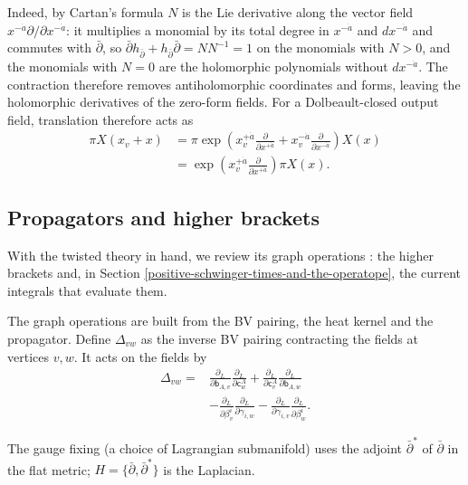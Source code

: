 \documentclass[11pt]{article}
\numberwithin{equation}{section}
\numberwithin{figure}{section}
\numberwithin{table}{section}
\begin{document}
Indeed, by Cartan's formula $N$ is the Lie derivative along the vector field $x^{-\dot a}\partial/\partial x^{-\dot a}$: it multiplies a monomial by its total degree in $x^{-\dot a}$ and $dx^{-\dot a}$ and commutes with $\bar\partial$, so $\bar\partial h_{\bar\partial}+h_{\bar\partial}\bar\partial=NN^{-1}=1$ on the monomials with $N>0$, and the monomials with $N=0$ are the holomorphic polynomials without $dx^{-\dot a}$. The contraction therefore removes antiholomorphic coordinates and forms, leaving the holomorphic derivatives of the zero-form fields. For a Dolbeault-closed output field, translation therefore acts as
\begin{equation}\label{eq-B-21}
\begin{aligned}
\pi X(x_v+x)
&=\pi\exp\left(x_v^{+\dot a}\frac{\partial}{\partial x^{+\dot a}}
+x_v^{-\dot a}\frac{\partial}{\partial x^{-\dot a}}\right)X(x)\\
&=\exp\left(x_v^{+\dot a}\frac{\partial}{\partial x^{+\dot a}}\right)\pi X(x).
\end{aligned}
\end{equation}

\subsection{Propagators and higher brackets}\label{sec-brackets}\label{sec-setup}

With the twisted theory in hand, we review its graph operations \cite{semichiral,Wang,operatope,higher,BK}: the higher brackets and, in Section \ref{positive-schwinger-times-and-the-operatope}, the current integrals that evaluate them.

The graph operations are built from the BV pairing, the heat kernel and the propagator. Define $\Delta_{vw}$ as the inverse BV pairing contracting the fields at vertices $v,w$. It acts on the fields by
\begin{equation}\label{eq-A-20}
\begin{aligned}
\Delta_{vw}={}&
\frac{\partial_L}{\partial\mathsf b_{A,v}}
\frac{\partial_L}{\partial\mathsf c_w^A}
+
\frac{\partial_L}{\partial\mathsf c_v^A}
\frac{\partial_L}{\partial\mathsf b_{A,w}}
\\
&-
\frac{\partial_L}{\partial\beta_v^i}
\frac{\partial_L}{\partial\gamma_{i,w}}
-
\frac{\partial_L}{\partial\gamma_{i,v}}
\frac{\partial_L}{\partial\beta_w^i}.
\end{aligned}
\end{equation}

The gauge fixing (a choice of Lagrangian submanifold) uses the adjoint $\bar\partial^*$ of $\bar\partial$ in the flat metric; $H=\{\bar\partial,\bar\partial^*\}$ is the Laplacian.
\end{document}
